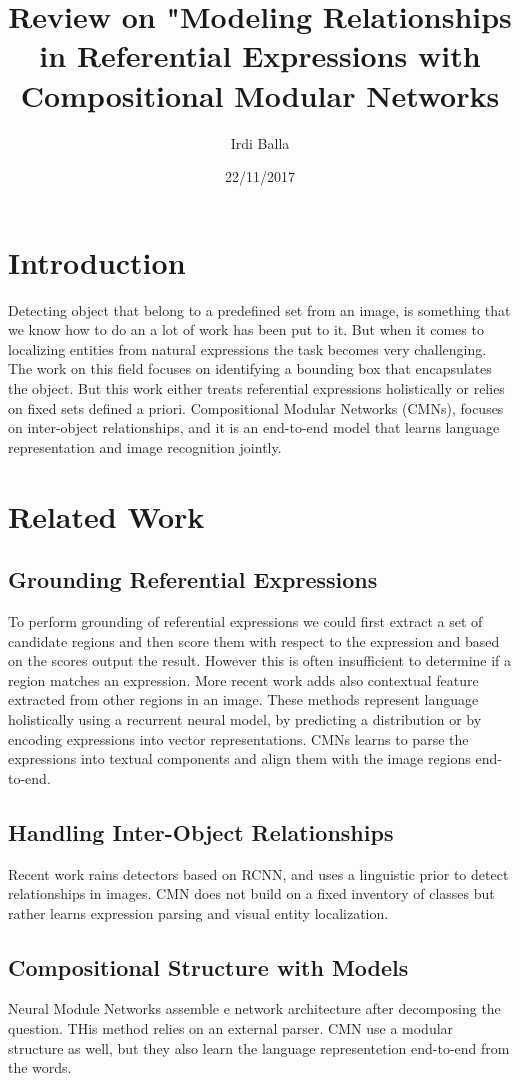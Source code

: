 \documentclass{article}
\title{Review on "Modeling Relationships in Referential Expressions with Compositional Modular Networks}
\date{22/11/2017}
\author{Irdi Balla}
\begin{document}
	\maketitle	
	\section{Introduction}
	Detecting object that belong to a predefined set from an image, is something that we know how to do an  a lot of work has been put to it. But when it comes to localizing entities from natural expressions the task becomes very challenging. The work on this field focuses on identifying a bounding box that encapsulates the object. But this work either treats referential expressions holistically or relies on fixed sets defined a priori. Compositional Modular Networks (CMNs), focuses on inter-object relationships, and it is an end-to-end model that learns language representation and image recognition jointly.
	\section{Related Work}
	\subsection{Grounding Referential Expressions}
	 To perform grounding of referential expressions we could first extract a set of candidate regions and then score them with respect to the expression and based on the scores output the result. However this is often insufficient  to determine if a region matches an expression. More recent work adds also contextual feature extracted from other regions in an image. These methods represent language holistically using a recurrent neural model, by predicting a distribution or by encoding expressions into vector representations. CMNs learns to parse the expressions into textual components and align them with the image regions end-to-end.
	 \subsection{Handling Inter-Object Relationships}
	 Recent work rains detectors based on RCNN, and uses a linguistic prior to detect relationships in images. CMN does not build on a fixed inventory of classes but rather learns expression parsing and visual entity localization.
	 \subsection{Compositional Structure with Models}
	 Neural Module Networks assemble e network architecture after decomposing the question. THis method relies on an external parser. CMN use a modular structure as well, but they also learn the language representetion end-to-end from the words.
\end{document}

